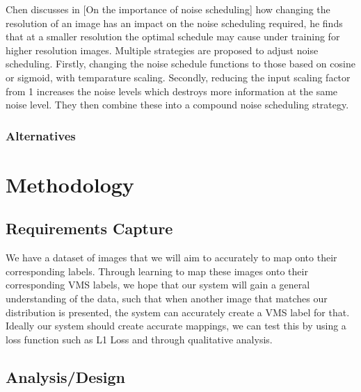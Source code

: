 \documentclass{UoYCSproject}
\begin{document}

Chen discusses in [On the importance of noise scheduling] how changing the resolution of an image has an impact on the noise scheduling required, he finds that at a smaller resolution the optimal schedule may cause under training for higher resolution images. Multiple strategies are proposed to adjust noise scheduling. Firstly, changing the noise schedule functions to those based on cosine or sigmoid, with temparature scaling. Secondly, reducing the input scaling factor from 1 increases the noise levels which destroys more information at the same noise level. They then combine these into a compound noise scheduling strategy.


\subsection{Alternatives}

\newpage{}

\chapter{Methodology}




\section{Requirements Capture}

We have a dataset of images that we will aim to accurately to map onto their corresponding labels. Through learning to map these images onto their corresponding VMS labels, we hope that our system will gain a general understanding of the data, such that when another image that matches our distribution is presented, the system can accurately create a VMS label for that. Ideally our system should create accurate mappings, we can test this by using a loss function such as L1 Loss and through qualitative analysis. 

\section{Analysis/Design}
\end{document}
